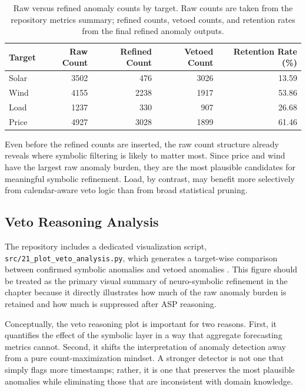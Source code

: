 
\begin{table}[htbp]
	\centering
	\caption{Raw versus refined anomaly counts by target. Raw counts are taken from the repository metrics summary; refined counts, vetoed counts, and retention rates from the final refined anomaly outputs.}
	\label{tab:raw_vs_refined_counts_ch72}
	\small
	\begin{tabular}{|p{2.5cm}|r|r|r|r|}
		\hline
		\textbf{Target} & \textbf{Raw Count} & \textbf{Refined Count} & \textbf{Vetoed Count} & \textbf{Retention Rate (\%)} \\
		\hline
		Solar & 3502 & 476 & 3026 & 13.59 \\
		Wind  & 4155 & 2238 & 1917 & 53.86 \\
		Load  & 1237 & 330 & 907 & 26.68 \\
		Price & 4927 & 3028 & 1899 & 61.46 \\
		\hline
	\end{tabular}
\end{table}

Even before the refined counts are inserted, the raw count structure already reveals where symbolic filtering is likely to matter most. Since price and wind have the largest raw anomaly burden, they are the most plausible candidates for meaningful symbolic refinement. Load, by contrast, may benefit more selectively from calendar-aware veto logic than from broad statistical pruning.

\subsection{Veto Reasoning Analysis}

The repository includes a dedicated visualization script, \texttt{src/21\_plot\_veto\_analysis.py}, which generates a target-wise comparison between confirmed symbolic anomalies and vetoed anomalies \cite{repo_thesis_grid_anomaly}. This figure should be treated as the primary visual summary of neuro-symbolic refinement in the chapter because it directly illustrates how much of the raw anomaly burden is retained and how much is suppressed after ASP reasoning.

Conceptually, the veto reasoning plot is important for two reasons. First, it quantifies the effect of the symbolic layer in a way that aggregate forecasting metrics cannot. Second, it shifts the interpretation of anomaly detection away from a pure count-maximization mindset. A stronger detector is not one that simply flags more timestamps; rather, it is one that preserves the most plausible anomalies while eliminating those that are inconsistent with domain knowledge.

